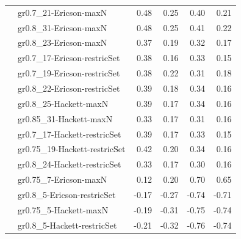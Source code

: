 {\begin{landscape}
\begin{footnotesize}
\begin{longtable}{@{}ll|rrrr@{}}
\addlinespace
\multirow{11}{*}{EMR} & gr0.7\_21-Ericson-maxN & 0.48 & 0.25 & 0.40 & 0.21 \\
 & gr0.8\_31-Ericson-maxN & 0.48 & 0.25 & 0.41 & 0.22 \\
 & gr0.8\_23-Ericson-maxN & 0.37 & 0.19 & 0.32 & 0.17 \\
 & gr0.7\_17-Ericson-restricSet & 0.38 & 0.16 & 0.33 & 0.15 \\
 & gr0.7\_19-Ericson-restricSet & 0.38 & 0.22 & 0.31 & 0.18 \\
 & gr0.8\_22-Ericson-restricSet & 0.39 & 0.18 & 0.34 & 0.16 \\
 & gr0.8\_25-Hackett-maxN & 0.39 & 0.17 & 0.34 & 0.16 \\
 & gr0.85\_31-Hackett-maxN & 0.33 & 0.17 & 0.31 & 0.16 \\
 & gr0.7\_17-Hackett-restricSet & 0.39 & 0.17 & 0.33 & 0.15 \\
 & gr0.75\_19-Hackett-restricSet & 0.42 & 0.20 & 0.34 & 0.16 \\
 & gr0.8\_24-Hackett-restricSet & 0.33 & 0.17 & 0.30 & 0.16 \\
\addlinespace
\multirow{4}{*}{Lifelong prod.} & gr0.75\_7-Ericson-maxN & 0.12 & 0.20 & 0.70 & 0.65 \\
 & gr0.8\_5-Ericson-restricSet & -0.17 & -0.27 & -0.74 & -0.71 \\
 & gr0.75\_5-Hackett-maxN & -0.19 & -0.31 & -0.75 & -0.74 \\
 & gr0.8\_5-Hackett-restricSet & -0.21 & -0.32 & -0.76 & -0.74 \\
\bottomrule
\end{longtable}
\end{footnotesize}
\end{landscape}
\clearpage%
}


